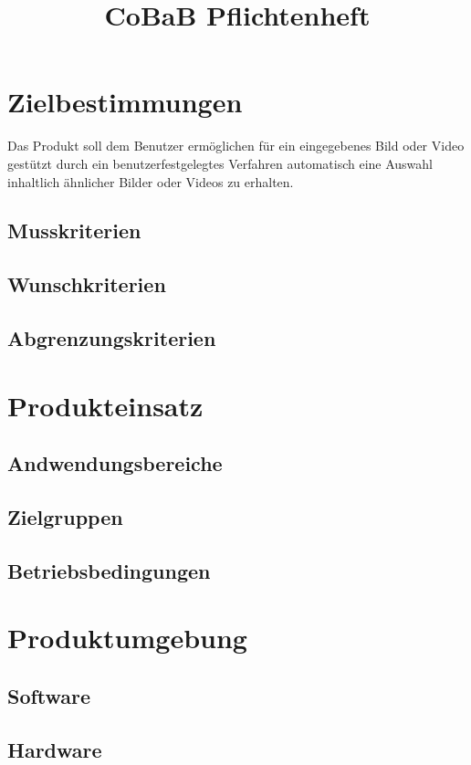 \documentclass[parskip=full]{scrartcl}
\title{CoBaB Pflichtenheft}
\begin{document}
\maketitle

\section{Zielbestimmungen}
Das Produkt soll dem Benutzer ermöglichen für ein eingegebenes Bild oder Video gestützt durch ein benutzerfestgelegtes Verfahren automatisch eine Auswahl inhaltlich ähnlicher Bilder oder Videos zu erhalten.
\subsection{Musskriterien}
\subsection{Wunschkriterien}
\subsection{Abgrenzungskriterien}

\section{Produkteinsatz}
\subsection{Andwendungsbereiche}
\subsection{Zielgruppen}
\subsection{Betriebsbedingungen}

\section{Produktumgebung}
\subsection{Software}
\subsection{Hardware}
\end{document}
